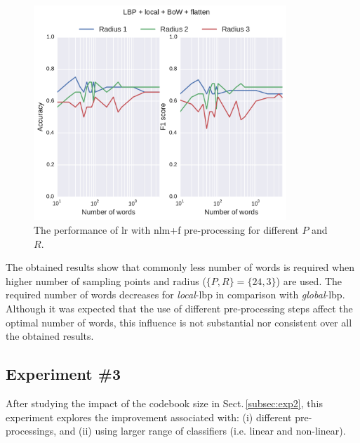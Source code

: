 \begin{figure}
\centering
\includegraphics[width=0.85\textwidth]{figure2}
\caption{The performance of \ac{lr} with \ac{nlm}+\ac{f} pre-processing for different $P$ and $R$.}
\label{fig:RBOW}
\end{figure}


The obtained results show that commonly less number of words is required when higher number of sampling points and radius ($\{P,R\} = \{24,3\}$) are used.
The required number of words decreases for \emph{local}-\ac{lbp} in comparison with \emph{global}-\ac{lbp}.
Although it was expected that the use of different pre-processing steps affect the optimal number of words, this influence is not substantial nor consistent over all the obtained results.


\subsection{Experiment \#3}\label{subsec:exp3}
%
%
%
%

After studying the impact of the codebook size in Sect.\,\ref{subsec:exp2}, this experiment explores the improvement associated with: (i) different pre-processings, and (ii) using larger range of classifiers (i.e. linear and non-linear).

